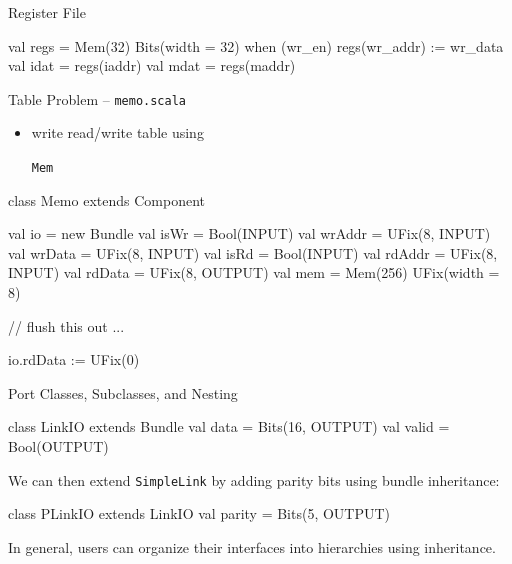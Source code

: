 \documentclass[xcolor=pdflatex,dvipsnames,table]{beamer}
\newcommand{\code}[1]{\begin{footnotesize}{\tt #1}\end{footnotesize}}
\begin{document}
\begin{frame}[fragile]{Register File}

\begin{scala}
val regs = Mem(32){ Bits(width = 32) }
when (wr_en) {
  regs(wr_addr) := wr_data
}
val idat = regs(iaddr)
val mdat = regs(maddr)
\end{scala}

\end{frame}

% 
% 

\begin{frame}[fragile]{Table Problem -- \tt memo.scala}
\begin{itemize}
\item write read/write table using \code{Mem}
\end{itemize}
\begin{scala}
class Memo extends Component {
  val io = new Bundle {
    val isWr    = Bool(INPUT)
    val wrAddr  = UFix(8, INPUT)
    val wrData  = UFix(8, INPUT)
    val isRd    = Bool(INPUT)
    val rdAddr  = UFix(8, INPUT)
    val rdData  = UFix(8, OUTPUT)
  }
  val mem = Mem(256){ UFix(width = 8) }

  // flush this out ...

  io.rdData := UFix(0)
}
\end{scala}
\end{frame}

% 
% 

\begin{frame}[fragile]{Port Classes, Subclasses, and Nesting}

\begin{scala}
class LinkIO extends Bundle { 
  val data  = Bits(16, OUTPUT) 
  val valid = Bool(OUTPUT)
}
\end{scala}

\noindent
We can then extend \verb+SimpleLink+ by adding parity bits using
bundle inheritance:

\begin{scala}
class PLinkIO extends LinkIO { 
  val parity = Bits(5, OUTPUT) 
}
\end{scala}

\noindent
In general, users can organize their interfaces into hierarchies using inheritance.  

\end{frame}
\end{document}
